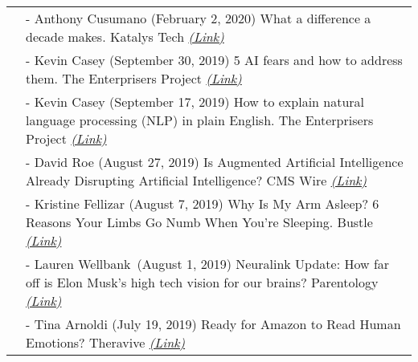 \documentclass[11pt]{cooperCV_v1/cooperCV} %
\begin{document}
\begin{minipage}{\textwidth}
\begin{tabular}{ @{} p{} p{} @{} }
  \small \textcolor{gray}{{\emph{ }}} & 
  - {\small Anthony Cusumano (February 2, 2020) What a difference a decade makes. Katalys Tech } \footnotesize \textcolor{gray}{\href{https://katalysttech.com/blog/what-a-difference-a-decade-makes/}{\emph{(Link)}}} \\
  
  \small \textcolor{gray}{{\emph{ }}} & 
  - {\small Kevin Casey (September 30, 2019)  5 AI fears and how to address them. The Enterprisers Project } \footnotesize \textcolor{gray}{\href{https://enterprisersproject.com/article/2019/9/artificial-intelligence-ai-fears-how-address}{\emph{(Link)}}} \\
  
  \small \textcolor{gray}{{\emph{ }}} & 
  - {\small Kevin Casey (September 17, 2019) How to explain natural language processing (NLP) in plain English. The Enterprisers Project } \footnotesize \textcolor{gray}{\href{https://enterprisersproject.com/article/2019/9/natural-language-processing-nlp-explained-plain-english}{\emph{(Link)}}} \\
  
  \small \textcolor{gray}{{\emph{ }}} & 
  - {\small David Roe (August 27, 2019) Is Augmented Artificial Intelligence Already Disrupting Artificial Intelligence? CMS Wire } \footnotesize \textcolor{gray}{\href{https://www.cmswire.com/digital-workplace/is-augmented-artificial-intelligence-already-disrupting-artificial-intelligence/}{\emph{(Link)}}} \\
  
  \small \textcolor{gray}{{\emph{ }}} & 
  - {\small Kristine Fellizar (August 7, 2019) Why Is My Arm Asleep? 6 Reasons Your Limbs Go Numb When You're Sleeping. Bustle } \footnotesize \textcolor{gray}{\href{https://www.bustle.com/p/why-is-my-arm-asleep-6-reasons-your-limbs-go-numb-when-youre-sleeping-18552723}{\emph{(Link)}}} \\
  
  \small \textcolor{gray}{{\emph{ }}} & 
  - {\small Lauren Wellbank (August 1, 2019) Neuralink Update: How far off is Elon Musk’s high tech vision for our brains? Parentology } \footnotesize \textcolor{gray}{\href{https://parentology.com/neuralink-how-far-off-is-elon-musks-high-tech-vision-for-our-brains/}{\emph{(Link)}}} \\
  
  \small \textcolor{gray}{{\emph{ }}} & 
  - {\small Tina Arnoldi (July 19, 2019) Ready for Amazon to Read Human Emotions? Theravive } \footnotesize \textcolor{gray}{\href{https://www.theravive.com/today/post/ready-for-amazon-to-read-human-emotions-0003426.aspx}{\emph{(Link)}}} \\
  

\end{tabular}
\end{minipage}
\end{document}
